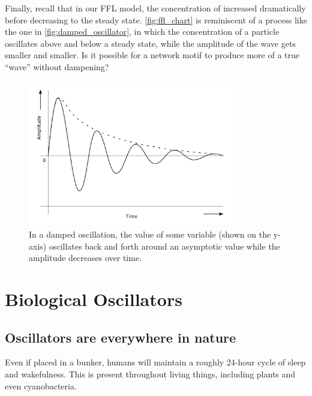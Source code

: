 Finally, recall that in our FFL model, the concentration of  increased dramatically before decreasing to the steady state. \autoref{fig:ffl_chart} is reminiscent of a  process like the one in \autoref{fig:damped_oscillator}, in which the concentration of a particle oscillates above and below a steady state, while the amplitude of the wave gets smaller and smaller. Is it possible for a network motif to produce more of a true ``wave'' without dampening?\\

\begin{figure}[h]
\centering
\mySfFamily
\includegraphics[width = 0.8\textwidth]{../images/damped_oscillator.png}
\caption{In a damped oscillation, the value of some variable (shown on the y-axis) oscillates back and forth around an asymptotic value while the amplitude decreases over time.}
\label{fig:damped_oscillator}
\end{figure}


\FloatBarrier
{}

\section{Biological Oscillators}
\label{sec:biological_oscillators}

\subsection{Oscillators are everywhere in nature}

Even if placed in a bunker, humans will maintain a roughly 24-hour cycle of sleep and wakefulness. This  is present throughout living things, including plants and even cyanobacteria.

